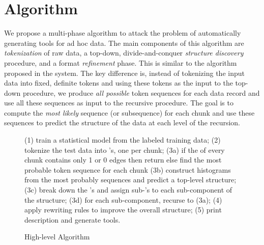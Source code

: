 
\section{Algorithm}\label{sec:algo}

We propose a multi-phase algorithm to attack the problem of
automatically generating tools for ad hoc data. 
The main components of
this algorithm are {\em tokenization} of raw data, 
a top-down, divide-and-conquer {\em structure discovery} procedure,
and a format {\em refinement} phase. This is similar to 
the algorithm proposed in the \learnpads{} system. 
The key difference is, instead of tokenizing the input data into 
fixed, definite tokens and using these tokens as the input to the top-down
procedure, we produce {\em all possible} token sequences for each 
data record and use all these sequences as input to the 
recursive procedure. The goal is to compute the {\em most likely}
sequence (or subsequence) for each chunk and use these sequences to predict the 
structure of the data at each level of the recursion.

\begin{figure}[t]
\begin{centercode}
(1) train a statistical model from the labeled training data;
(2) tokenize the test data into \seqset's, one \seqset{} per chunk;
(3a) if the \seqset{} of every chunk contains only 1 or 0 edges then 
      return
    else 
      find the most probable token sequence for each chunk 
(3b) construct histograms from the most probably sequences and 
    predict a top-level structure;
(3c) break down the \seqset's and assign sub-\seqset's to each 
    sub-component of the structure;
(3d) for each sub-component, recurse to (3a);
(4) apply rewriting rules to improve the overall structure;
(5) print description and generate tools.
\end{centercode}
\caption{High-level Algorithm}\label{fig:algo}
\end{figure}

